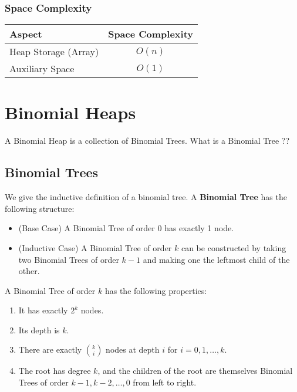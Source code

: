 \documentclass[a4paper,10pt]{article}
\begin{document}
\subsubsection*{Space Complexity}
\begin{table}[H]
    \raggedright
    \begin{tabular}{|l|c|}
    \hline
    \textbf{Aspect}         & \textbf{Space Complexity} \\ \hline
    Heap Storage (Array)    & $O(n)$                    \\ \hline
    Auxiliary Space         & $O(1)$                    \\ \hline
    \end{tabular}
\end{table}

\section{Binomial Heaps}
A Binomial Heap is a collection of Binomial Trees. What is a Binomial Tree ??

\subsection{Binomial Trees}
We give the inductive definition of a binomial tree.
A \textbf{Binomial Tree} has the following structure:
\begin{itemize}
    \item (Base Case) A Binomial Tree of order 0 has exactly 1 node.
    \item (Inductive Case) A Binomial Tree of order $k$ can be constructed by taking two Binomial Trees of order $k-1$ and making one the leftmost child of the other.
\end{itemize} 

A Binomial Tree of order $k$ has the following properties:
\begin{enumerate}
    \item It has exactly $2^k$ nodes.
    \item Its depth is $k$.
    \item There are exactly $\binom{k}{i}$ nodes at depth $i$ for $i = 0, 1, \ldots, k$.
    \item The root has degree $k$, and the children of the root are themselves Binomial Trees of order $k-1, k-2, \ldots, 0$ from left to right.
\end{enumerate}
\end{document}
